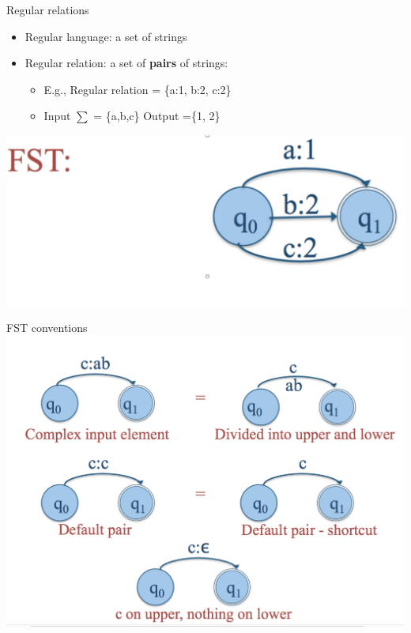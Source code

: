 \documentclass{beamer}
\begin{document}
\begin{frame}{Regular relations}
  \begin{itemize}
  \item Regular language: a set of strings
  \item Regular relation: a set of {\bf pairs} of strings:
    \begin{itemize}
    \item E.g., Regular relation = \{a:1, b:2, c:2\}
    \item Input $\sum$ = \{a,b,c\} Output =\{1, 2\}
    \end{itemize}
  \end{itemize}
  \includegraphics[width=\textwidth]{figures/fst1}
\end{frame}

\begin{frame}{FST conventions}
  \includegraphics[width=\textwidth]{figures/fst-conventions}
\end{frame}
\end{document}
